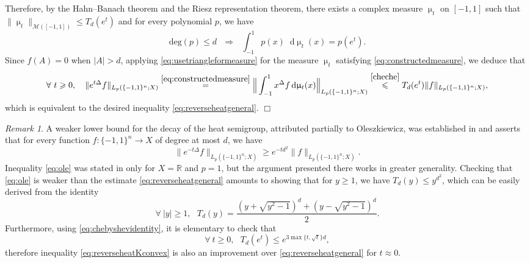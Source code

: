 \documentclass[11pt,reqno]{amsart}
\renewcommand{\leq}{\leqslant}
\renewcommand{\geq}{\geqslant}
\newcommand{\R}{\mathbb R}
\newcommand{\1}{\mathbf 1}
\theoremstyle{remark}
\newtheorem{remark}[theorem]{Remark}
\renewcommand{\mu}{\upmu}
\newcommand*\diff{\mathop{}\!\mathrm{d}}
\newcommand{\ms}{\mathscr}
\begin{document}
Therefore, by the Hahn--Banach theorem and the Riesz representation theorem, there exists a complex measure $\mu_t$ on $[-1,1]$ such that $\|\mu_t\|_{\ms{M}([-1,1])}\leq T_d(e^t)$ and for every polynomial $p$, we have
\begin{equation} \label{eq:constructedmeasure}
\mathrm{deg}(p)\leq d \ \ \ \Longrightarrow \ \ \ \int_{-1}^1 p(x)\diff\mu_t(x) = p(e^t).
\end{equation}
Since $\widehat{f}(A)=0$ when $|A|>d$, applying \eqref{eq:usetriangleformeasure} for the measure $\mu_t$ satisfying \eqref{eq:constructedmeasure}, we deduce that
\begin{equation}
\forall \ t\geq0, \ \ \ \|e^{t\Delta} f\|_{L_p(\{-1,1\}^n;X)} \stackrel{\eqref{eq:constructedmeasure}}{=} \Big\| \int_{-1}^1 x^\Delta f \diff\mu_t(x)\Big\|_{L_p(\{-1,1\}^n;X)} \stackrel{\eqref{cheche}}{\leq} T_d(e^t) \|f\|_{L_p(\{-1,1\}^n;X)},
\end{equation}
which is equivalent to the desired inequality \eqref{eq:reverseheatgeneral}.
\hfill$\Box$

\begin{remark} \label{rem:ole}
A weaker lower bound for the decay of the heat semigroup, attributed partially to Oleszkiewicz, was established in \cite[Lemma~5.4]{FHKL16} and asserts that for every function $f:\{-1,1\}^n \to X$ of degree at most $d$, we have
\begin{equation} \label{eq:ole}
\|e^{-t\Delta}f\|_{L_p(\{-1,1\}^n;X)} \geq e^{-td^2} \|f\|_{L_p(\{-1,1\}^n;X)}.
\end{equation}
Inequality \eqref{eq:ole} was stated in \cite{FHKL16} only for $X=\R$ and $p=1$, but the argument presented there works in greater generality. Checking that \eqref{eq:ole} is weaker than the estimate \eqref{eq:reverseheatgeneral} amounts to showing that for $y\geq1$, we have $T_d(y)\leq y^{d^2}$, which can be easily derived from the identity
\begin{equation} \label{eq:chebyshevidentity}
\forall \ |y|\geq1, \ \ \ T_d(y) = \frac{(y+\sqrt{y^2-1})^d+(y-\sqrt{y^2-1})^d}{2}.
\end{equation}
Furthermore, using \eqref{eq:chebyshevidentity}, it is elementary to check that
\begin{equation} \label{eq:chsqrt}
\forall \ t\geq0, \ \ \ T_d(e^t) \leq e^{3\max\{t,\sqrt{t}\}d},
\end{equation}
therefore inequality \eqref{eq:reverseheatKconvex} is also an improvement over \eqref{eq:reverseheatgeneral} for $t\approx0$.
\end{remark}
\end{document}
